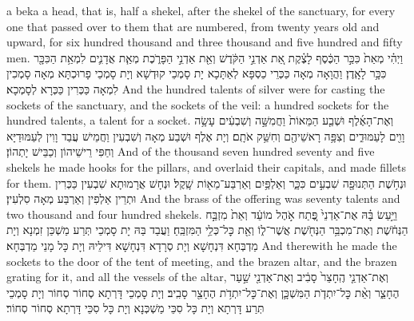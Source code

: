 {{a beka a head, that is, half a shekel, after the shekel of the sanctuary, for every one that passed over to them that are numbered, from twenty years old and upward, for six hundred thousand and three thousand and five hundred and fifty men.}{}
{וַיְהִ֗י מְאַת֙ כִּכַּ֣ר הַכֶּ֔סֶף לָצֶ֗קֶת אֵ֚ת אַדְנֵ֣י הַקֹּ֔דֶשׁ וְאֵ֖ת אַדְנֵ֣י הַפָּרֹ֑כֶת מְאַ֧ת אֲדָנִ֛ים לִמְאַ֥ת הַכִּכָּ֖ר כִּכָּ֥ר לָאָֽדֶן׃
}
{וַהֲוָאָה מְאָה כַּכְּרֵי כַסְפָּא לְאַתָּכָא יָת סָמְכֵי קוּדְשָׁא וְיָת סָמְכֵי פָרוּכְתָּא מְאָה סָמְכִין לִמְאָה כַּכְּרִין כַּכְּרָא לְסָמְכָא׃}
{And the hundred talents of silver were for casting the sockets of the sanctuary, and the sockets of the veil: a hundred sockets for the hundred talents, a talent for a socket.}{}
{וְאֶת־הָאֶ֜לֶף וּשְׁבַ֤ע הַמֵּאוֹת֙ וַחֲמִשָּׁ֣ה וְשִׁבְעִ֔ים עָשָׂ֥ה וָוִ֖ים לָעַמּוּדִ֑ים וְצִפָּ֥ה רָאשֵׁיהֶ֖ם וְחִשַּׁ֥ק אֹתָֽם׃
}
{וְיָת אֶלֶף וּשְׁבַע מְאָה וְשִׁבְעִין וַחֲמֵישׁ עֲבַד וָוִין לְעַמּוּדַיָּא וְחַפִּי רֵישֵׁיהוֹן וְכַבֵּישׁ יָתְהוֹן׃}
{And of the thousand seven hundred seventy and five shekels he made hooks for the pillars, and overlaid their capitals, and made fillets for them.}{}
{וּנְחֹ֥שֶׁת הַתְּנוּפָ֖ה שִׁבְעִ֣ים כִּכָּ֑ר וְאַלְפַּ֥יִם וְאַרְבַּע־מֵא֖וֹת שָֽׁקֶל׃}
{וּנְחָשׁ אֲרָמוּתָא שִׁבְעִין כַּכְּרִין וּתְרֵין אַלְפִין וְאַרְבַּע מְאָה סִלְעִין׃}
{And the brass of the offering was seventy talents and two thousand and four hundred shekels.}{}
{וַיַּ֣עַשׂ בָּ֗הּ אֶת־אַדְנֵי֙ פֶּ֚תַח אֹ֣הֶל מוֹעֵ֔ד וְאֵת֙ מִזְבַּ֣ח הַנְּחֹ֔שֶׁת וְאֶת־מִכְבַּ֥ר הַנְּחֹ֖שֶׁת אֲשֶׁר־ל֑וֹ וְאֵ֖ת כׇּל־כְּלֵ֥י הַמִּזְבֵּֽחַ׃}
{וַעֲבַד בַּהּ יָת סָמְכֵי תְּרַע מַשְׁכַּן זִמְנָא וְיָת מַדְבְּחָא דִּנְחָשָׁא וְיָת סְרָדָא דִּנְחָשָׁא דִּילֵיהּ וְיָת כָּל מָנֵי מַדְבְּחָא׃}
{And therewith he made the sockets to the door of the tent of meeting, and the brazen altar, and the brazen grating for it, and all the vessels of the altar,}{}
{וְאֶת־אַדְנֵ֤י הֶֽחָצֵר֙ סָבִ֔יב וְאֶת־אַדְנֵ֖י שַׁ֣עַר הֶחָצֵ֑ר וְאֵ֨ת כׇּל־יִתְדֹ֧ת הַמִּשְׁכָּ֛ן וְאֶת־כׇּל־יִתְדֹ֥ת הֶחָצֵ֖ר סָבִֽיב׃}
{וְיָת סָמְכֵי דָּרְתָא סְחוֹר סְחוֹר וְיָת סָמְכֵי תְּרַע דָּרְתָא וְיָת כָּל סִכֵּי מַשְׁכְּנָא וְיָת כָּל סִכֵּי דָּרְתָא סְחוֹר סְחוֹר׃}
}
